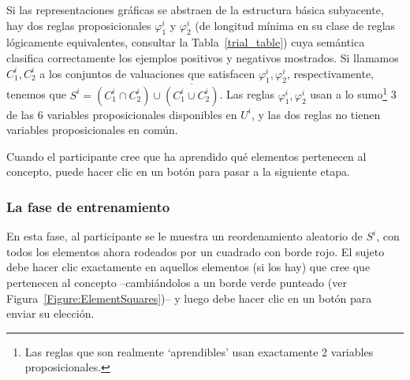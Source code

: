 Si las representaciones gráficas se abstraen de la estructura básica subyacente, hay dos reglas proposicionales $ \varphi^i_1 $ y $ \varphi^i_2 $ (de longitud mínima en su clase de reglas lógicamente equivalentes, consultar la Tabla~\ref{trial_table}) cuya semántica clasifica correctamente los ejemplos positivos y negativos mostrados. Si llamamos $ C^i_1, C^i_2 $ a los conjuntos de valuaciones que satisfacen $ \varphi^i_1, \varphi^i_2 $, respectivamente, tenemos que $ S^i = (C^i_1 \cap C^i_2) \cup \overline {(C^i_1 \cup C^i_2)} $. Las reglas $ \varphi^i_1, \varphi^i_2 $ usan a lo sumo\footnote{Las reglas que son realmente `aprendibles' usan exactamente 2 variables proposicionales.} 3 de las 6 variables proposicionales disponibles en $ U^i $, y las dos reglas no tienen variables proposicionales en común.

Cuando el participante cree que ha aprendido qué elementos pertenecen al concepto, puede hacer clic en un botón para pasar a la siguiente etapa.

\subsubsection{La fase de entrenamiento}\label{Subsection:training}

En esta fase, al participante se le muestra un reordenamiento aleatorio de $S^i $, con todos los elementos ahora rodeados por un cuadrado con borde rojo. El sujeto debe hacer clic exactamente en aquellos elementos (si los hay) que cree que pertenecen al concepto --cambiándolos a un borde verde punteado (ver Figura~\ref{Figure:ElementSquares})-- y luego debe hacer clic en un botón para enviar su elección.

